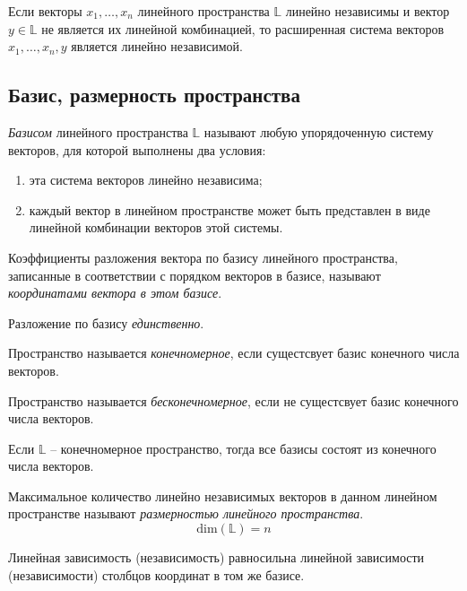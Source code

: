 \begin{property}
    Если векторы $x_1, \ldots, x_n$ линейного пространства $\mathbb{L}$ линейно независимы и вектор $y \in \mathbb{L}$ не является их линейной комбинацией, то расширенная система векторов $x_1, \ldots , x_n, y$ является линейно независимой.
\end{property}

\subsection{Базис, размерность пространства}

\begin{definition}[Базис]
    \textit{Базисом} линейного пространства $\mathbb{L}$ называют любую упорядоченную систему векторов, для которой выполнены два условия:
    \begin{enumerate}
        \item эта система векторов линейно независима;
        \item каждый вектор в линейном пространстве может быть представлен в виде линейной комбинации векторов этой системы.
    \end{enumerate}
\end{definition}

\begin{definition}
    Коэффициенты разложения вектора по базису линейного пространства, записанные в соответствии с порядком векторов в базисе, называют \textit{координатами вектора в этом базисе}.
\end{definition}

\begin{theorem}
    Разложение по базису \textit{единственно}.
\end{theorem}

\begin{definition}
    Пространство называется \textit{конечномерное}, если сущестсвует базис конечного числа векторов.
\end{definition}

\begin{definition}
    Пространство называется \textit{бесконечномерное}, если не сущестсвует базис конечного числа векторов.
\end{definition}

\begin{theorem}
    Если $\mathbb{L}$ -- конечномерное пространство, тогда все базисы состоят из конечного числа векторов.
\end{theorem}

\begin{definition}
    Максимальное количество линейно независимых векторов в данном линейном пространстве называют \textit{размерностью линейного пространства}. \[
        \mathrm{dim} (\mathbb{L}) = n
    \]
\end{definition}

Линейная зависимость (независимость) равносильна линейной зависимости (независимости) столбцов координат в том же базисе.
